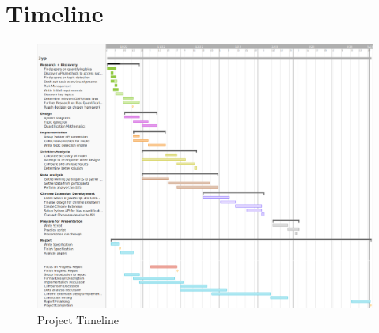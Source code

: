 \documentclass[a4paper,fleqn,10pt]{article}
\begin{document}

\section{Timeline}
\label{sec:timeline}
\begin{figure}[htbp]
    \includegraphics[width=150mm]{../images/3yp timeline.png}
    \caption{Project Timeline}
    \label{fig:timeline}
\end{figure}
\end{document}
